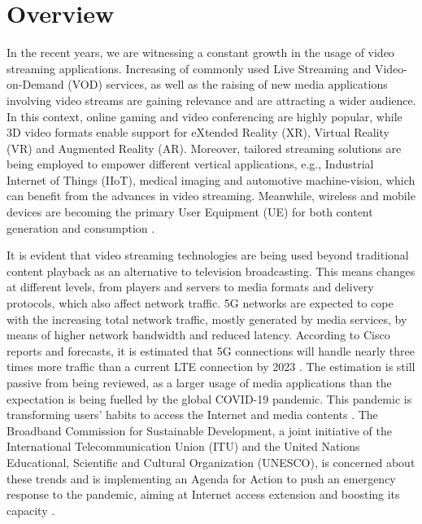 
\section{Overview}

In the recent years, we are witnessing a constant growth in the usage of video streaming applications. Increasing of commonly used Live Streaming and Video-on-Demand (VOD) services, as well as the raising of new media applications involving video streams are gaining relevance and are attracting a wider audience. In this context, online gaming and video conferencing are highly popular, while 3D video formats enable support for eXtended Reality (XR), Virtual Reality (VR) and Augmented Reality (AR). Moreover, tailored streaming solutions are being employed to empower different vertical applications, e.g., Industrial Internet of Things (IIoT), medical imaging and automotive machine-vision, which can benefit from the advances in video streaming. Meanwhile, wireless and mobile devices are becoming the primary User Equipment (UE) for both content generation and consumption \cite{wolf2015news}.

It is evident that video streaming technologies are being used beyond traditional content playback as an alternative to television broadcasting. This means changes at different levels, from players and servers to media formats and delivery protocols, which also affect network traffic. 5G networks are expected to cope with the increasing total network traffic, mostly generated by media services, by means of higher network bandwidth and reduced latency. According to Cisco reports and forecasts, it is estimated that 5G connections will handle nearly three times more traffic than a current LTE connection by 2023 \cite{Cisco2020}. The estimation is still passive from being reviewed, as a larger usage of media applications than the expectation is being fuelled by the global COVID-19 pandemic. This pandemic is transforming users' habits to access the Internet \cite{Lutu2020, Feldmann2020} and media contents \cite{Favale2020, King2020}. The Broadband Commission for Sustainable Development, a joint initiative of the International Telecommunication Union (ITU) and the United Nations Educational, Scientific and Cultural Organization (UNESCO), is concerned about these trends and is implementing an Agenda for Action to push an emergency response to the pandemic, aiming at Internet access extension and boosting its capacity \cite{BroadbandCommission, ICTaffordability}.

